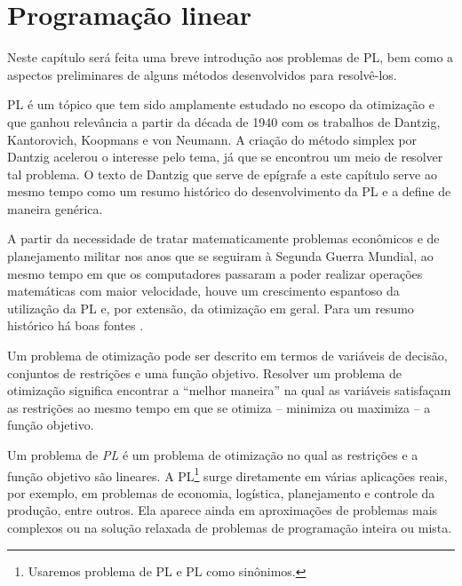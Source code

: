 

\chapter{Programação linear}  
   
\label{chap:linprog}

   Neste capítulo será feita uma breve introdução aos problemas de
 \ac{PL}, bem como a aspectos preliminares de
alguns métodos desenvolvidos para resolvê-los. 

\acl{PL} é um tópico que tem sido amplamente estudado no escopo da otimização e
que ganhou relevância a partir da década de 1940 com os trabalhos de Dantzig,
Kantorovich, Koopmans e von Neumann. A criação do método simplex por Dantzig 
acelerou o interesse pelo tema, já que se encontrou um meio de resolver tal problema. O texto de Dantzig que serve de epígrafe a este capítulo  serve ao mesmo tempo como um resumo histórico do
desenvolvimento da \ac{PL} e a define de maneira genérica.


A partir da necessidade de tratar matematicamente problemas econômicos
e de planejamento militar nos anos que se seguiram à Segunda Guerra Mundial, ao
mesmo tempo em que os computadores passaram a poder realizar operações
matemáticas com maior velocidade, houve um crescimento espantoso da utilização
da \ac{PL} e, por extensão, da otimização em geral. Para um resumo histórico há
boas fontes
\cite{Schrijver:Theory-of-Linear:1986k,Dantzig:Linear-Programming:1963t}.

Um problema de otimização pode ser descrito em termos de variáveis de decisão,
conjuntos de restrições e uma função objetivo. Resolver um problema de
otimização significa encontrar a ``melhor maneira'' na qual as variáveis
satisfaçam as restrições ao mesmo tempo em que se otimiza -- 
minimiza ou maximiza --  a função objetivo. 
 
Um problema de \emph{\acl{PL}}  é um problema de otimização no qual as
restrições e a função objetivo são lineares. A \ac{PL}\footnote{Usaremos
problema de PL e PL como sinônimos.} surge diretamente em várias aplicações
reais, por exemplo, em problemas de economia, logística, planejamento e controle
da produção, entre outros. Ela aparece ainda em aproximações de problemas mais
complexos ou na solução relaxada de problemas de programação inteira ou mista.


